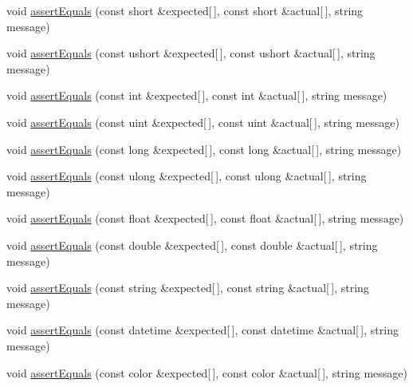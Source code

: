 \begin{DoxyCompactItemize}
\item 
void \mbox{\hyperlink{class_m_t_unit_a071dd02f075cd278e383767684135ec8}{assert\+Equals}} (const short \&expected\mbox{[}$\,$\mbox{]}, const short \&actual\mbox{[}$\,$\mbox{]}, string message)
\item 
void \mbox{\hyperlink{class_m_t_unit_a8ddce74ac19c972b7cacefc21522a1d1}{assert\+Equals}} (const ushort \&expected\mbox{[}$\,$\mbox{]}, const ushort \&actual\mbox{[}$\,$\mbox{]}, string message)
\item 
void \mbox{\hyperlink{class_m_t_unit_a0cd5f3f0134dc20e0cf9150987db8276}{assert\+Equals}} (const int \&expected\mbox{[}$\,$\mbox{]}, const int \&actual\mbox{[}$\,$\mbox{]}, string message)
\item 
void \mbox{\hyperlink{class_m_t_unit_a7cba3cdcc84f3485aa18ef6d955e82b6}{assert\+Equals}} (const uint \&expected\mbox{[}$\,$\mbox{]}, const uint \&actual\mbox{[}$\,$\mbox{]}, string message)
\item 
void \mbox{\hyperlink{class_m_t_unit_a4467d295e5b98ad3d12c558a20ab7490}{assert\+Equals}} (const long \&expected\mbox{[}$\,$\mbox{]}, const long \&actual\mbox{[}$\,$\mbox{]}, string message)
\item 
void \mbox{\hyperlink{class_m_t_unit_ad44c2240c937953188de4f94e6724528}{assert\+Equals}} (const ulong \&expected\mbox{[}$\,$\mbox{]}, const ulong \&actual\mbox{[}$\,$\mbox{]}, string message)
\item 
void \mbox{\hyperlink{class_m_t_unit_ab15646b74a28153c94f48d85776abc79}{assert\+Equals}} (const float \&expected\mbox{[}$\,$\mbox{]}, const float \&actual\mbox{[}$\,$\mbox{]}, string message)
\item 
void \mbox{\hyperlink{class_m_t_unit_a118601df140c5ae0a64dbed787ee57fe}{assert\+Equals}} (const double \&expected\mbox{[}$\,$\mbox{]}, const double \&actual\mbox{[}$\,$\mbox{]}, string message)
\item 
void \mbox{\hyperlink{class_m_t_unit_ab6b5f7674e23c24b08c0cbc4b8cc7937}{assert\+Equals}} (const string \&expected\mbox{[}$\,$\mbox{]}, const string \&actual\mbox{[}$\,$\mbox{]}, string message)
\item 
void \mbox{\hyperlink{class_m_t_unit_a7282c4d267a78b1270c99a52cf344cad}{assert\+Equals}} (const datetime \&expected\mbox{[}$\,$\mbox{]}, const datetime \&actual\mbox{[}$\,$\mbox{]}, string message)
\item 
void \mbox{\hyperlink{class_m_t_unit_ac757c452569aa85927b56dee69a97ea0}{assert\+Equals}} (const color \&expected\mbox{[}$\,$\mbox{]}, const color \&actual\mbox{[}$\,$\mbox{]}, string message)
\end{DoxyCompactItemize}


